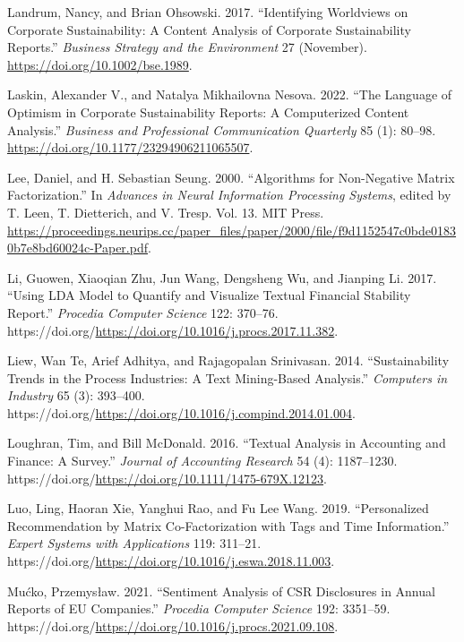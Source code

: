 \documentclass[
]{article}
\newlength{\cslhangindent}
\newlength{\cslentryspacingunit} %
\newenvironment{CSLReferences}[2] %
 {%
  \setlength{\parindent}{0pt}
  \ifodd #1
  \let\oldpar\par
  \def\par{\hangindent=\cslhangindent\oldpar}
  \fi
  \setlength{\parskip}{#2\cslentryspacingunit}
 }%
 {}
\begin{document}
\begin{CSLReferences}{1}{0}
\leavevmode{}%
Landrum, Nancy, and Brian Ohsowski. 2017. {``Identifying Worldviews on Corporate Sustainability: A Content Analysis of Corporate Sustainability Reports.''} \emph{Business Strategy and the Environment} 27 (November). \url{https://doi.org/10.1002/bse.1989}.

\leavevmode{}%
Laskin, Alexander V., and Natalya Mikhailovna Nesova. 2022. {``The Language of Optimism in Corporate Sustainability Reports: A Computerized Content Analysis.''} \emph{Business and Professional Communication Quarterly} 85 (1): 80--98. \url{https://doi.org/10.1177/23294906211065507}.

\leavevmode{}%
Lee, Daniel, and H. Sebastian Seung. 2000. {``Algorithms for Non-Negative Matrix Factorization.''} In \emph{Advances in Neural Information Processing Systems}, edited by T. Leen, T. Dietterich, and V. Tresp. Vol. 13. MIT Press. \url{https://proceedings.neurips.cc/paper_files/paper/2000/file/f9d1152547c0bde01830b7e8bd60024c-Paper.pdf}.

\leavevmode{}%
Li, Guowen, Xiaoqian Zhu, Jun Wang, Dengsheng Wu, and Jianping Li. 2017. {``Using LDA Model to Quantify and Visualize Textual Financial Stability Report.''} \emph{Procedia Computer Science} 122: 370--76. https://doi.org/\url{https://doi.org/10.1016/j.procs.2017.11.382}.

\leavevmode{}%
Liew, Wan Te, Arief Adhitya, and Rajagopalan Srinivasan. 2014. {``Sustainability Trends in the Process Industries: A Text Mining-Based Analysis.''} \emph{Computers in Industry} 65 (3): 393--400. https://doi.org/\url{https://doi.org/10.1016/j.compind.2014.01.004}.

\leavevmode{}%
Loughran, Tim, and Bill McDonald. 2016. {``Textual Analysis in Accounting and Finance: A Survey.''} \emph{Journal of Accounting Research} 54 (4): 1187--1230. https://doi.org/\url{https://doi.org/10.1111/1475-679X.12123}.

\leavevmode{}%
Luo, Ling, Haoran Xie, Yanghui Rao, and Fu Lee Wang. 2019. {``Personalized Recommendation by Matrix Co-Factorization with Tags and Time Information.''} \emph{Expert Systems with Applications} 119: 311--21. https://doi.org/\url{https://doi.org/10.1016/j.eswa.2018.11.003}.

\leavevmode{}%
Mućko, Przemysław. 2021. {``Sentiment Analysis of CSR Disclosures in Annual Reports of EU Companies.''} \emph{Procedia Computer Science} 192: 3351--59. https://doi.org/\url{https://doi.org/10.1016/j.procs.2021.09.108}.


\end{CSLReferences}
\end{document}
